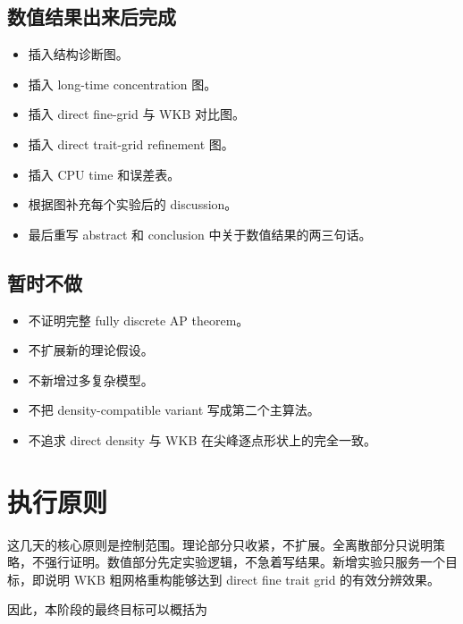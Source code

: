 \documentclass[11pt,a4paper]{ctexart}
\newcommand{\todoitem}[1]{\item[$\square$] #1}
\begin{document}
\subsection{数值结果出来后完成}

\begin{itemize}
    \todoitem{插入结构诊断图。}
    \todoitem{插入 long-time concentration 图。}
    \todoitem{插入 direct fine-grid 与 WKB 对比图。}
    \todoitem{插入 direct trait-grid refinement 图。}
    \todoitem{插入 CPU time 和误差表。}
    \todoitem{根据图补充每个实验后的 discussion。}
    \todoitem{最后重写 abstract 和 conclusion 中关于数值结果的两三句话。}
\end{itemize}

\subsection{暂时不做}

\begin{itemize}
    \item 不证明完整 fully discrete AP theorem。
    \item 不扩展新的理论假设。
    \item 不新增过多复杂模型。
    \item 不把 density-compatible variant 写成第二个主算法。
    \item 不追求 direct density 与 WKB 在尖峰逐点形状上的完全一致。
\end{itemize}

\section{执行原则}

这几天的核心原则是控制范围。理论部分只收紧，不扩展。全离散部分只说明策略，不强行证明。数值部分先定实验逻辑，不急着写结果。新增实验只服务一个目标，即说明 WKB 粗网格重构能够达到 direct fine trait grid 的有效分辨效果。

因此，本阶段的最终目标可以概括为
\begin{center}
\end{center}
\end{document}
